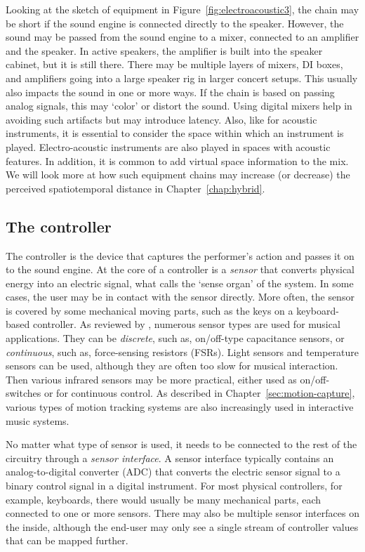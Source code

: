 Looking at the sketch of equipment in Figure~\ref{fig:electroacoustic3}, the chain may be short if the sound engine is connected directly to the speaker. However, the sound may be passed from the sound engine to a mixer, connected to an amplifier and the speaker. In active speakers, the amplifier is built into the speaker cabinet, but it is still there. There may be multiple layers of mixers, DI boxes, and amplifiers going into a large speaker rig in larger concert setups. This usually also impacts the sound in one or more ways. If the chain is based on passing analog signals, this may `color' or distort the sound. Using digital mixers help in avoiding such artifacts but may introduce latency. Also, like for acoustic instruments, it is essential to consider the space within which an instrument is played. Electro-acoustic instruments are also played in spaces with acoustic features. In addition, it is common to add virtual space information to the mix. We will look more at how such equipment chains may increase (or decrease) the perceived spatiotemporal distance in Chapter~\ref{chap:hybrid}.


\subsection{The controller}

The controller is the device that captures the performer's action and passes it on to the sound engine. At the core of a controller is a \emph{sensor} that converts physical energy into an electric signal, what \citet{bongers_physical_2000} calls the `sense organ' of the system.
In some cases, the user may be in contact with the sensor directly. More often, the sensor is covered by some mechanical moving parts, such as the keys on a keyboard-based controller. As reviewed by \citet{medeiros_comprehensive_2014}, numerous sensor types are used for musical applications. They can be \emph{discrete}, such as, on/off-type capacitance sensors, or \emph{continuous}, such as, force-sensing resistors (FSRs). Light sensors and temperature sensors can be used, although they are often too slow for musical interaction. Then various infrared sensors may be more practical, either used as on/off-switches or for continuous control. As described in Chapter~\ref{sec:motion-capture}, various types of motion tracking systems are also increasingly used in interactive music systems.

No matter what type of sensor is used, it needs to be connected to the rest of the circuitry through a \emph{sensor interface}. A sensor interface typically contains an analog-to-digital converter (ADC) that converts the electric sensor signal to a binary control signal in a digital instrument. For most physical controllers, for example, keyboards, there would usually be many mechanical parts, each connected to one or more sensors. There may also be multiple sensor interfaces on the inside, although the end-user may only see a single stream of controller values that can be mapped further.

